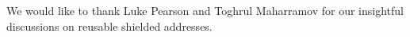 
We would like to thank Luke Pearson and Toghrul Maharramov for our insightful discussions on reusable shielded addresses.

